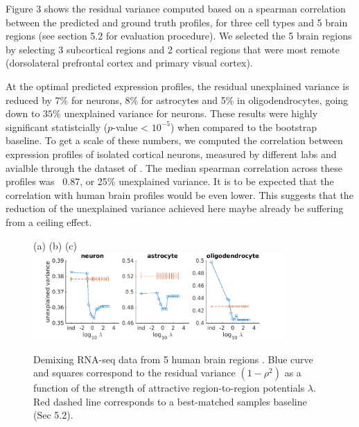 \documentclass{article} %
\begin{document}
Figure 3 shows the residual variance computed based on a spearman correlation between the predicted and ground truth profiles, for three cell types and 5 brain regions (see section 5.2 for evaluation procedure). We selected the 5 brain regions by selecting 3 subcortical regions and 2 cortical regions that were most remote (dorsolateral prefrontal cortex and primary visual cortex).

At the optimal predicted expression profiles, the residual unexplained variance is reduced by 7\% for neurons, 8\% for astrocytes and 5\% in oligodendrocytes, going down to $35\%$ unexplained variance for neurons. These results were highly significant statistcially ($p$-value < $10^{-5}$) when compared to the bootstrap baseline. To get a scale of these numbers, we computed the correlation between expression profiles of isolated cortical neurons, measured by different labs and avialble through the dataset of \cite{okaty2011cell}. The median spearman correlation across these profiles was ~0.87, or 25\% unexplained variance. It is to be expected that the correlation with human brain profiles would be even lower. This suggests that the reduction of the unexplained variance achieved here maybe already be suffering from a ceiling effect.

\begin{figure}[!hbt]
    \label{fig:human}
   (a) \hspace{120pt}(b) \hspace{120pt}(c) \hspace{120pt}
   \centering
     \includegraphics[width=0.85\textwidth]{3panels_var_AMY-CBC-DFC-HIP-V1C.png}
     \caption{Demixing RNA-seq data from 5 human brain regions \cite{brainspan}. Blue curve and squares correspond to the residual variance $(1-\rho^2)$ as a function of the strength of attractive region-to-region potentials $\lambda$. Red dashed line corresponds to a best-matched samples baseline (Sec 5.2).}
    
\end{figure}


\end{document}
